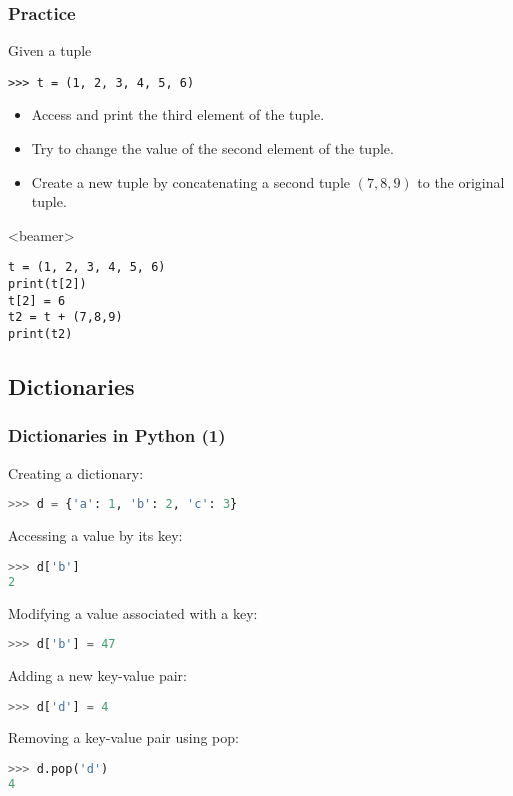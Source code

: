 \begin{frame}[fragile,label=practice_tuples]
  \frametitle{Practice}
  Given a tuple
  \begin{lstlisting}
>>> t = (1, 2, 3, 4, 5, 6)
  \end{lstlisting}
  \begin{itemize}
   \item Access and print the third element of the tuple.
   \item Try to change the value of the second element of the tuple.
   \item Create a new tuple by concatenating a second tuple \((7, 8, 9)\) to the original tuple.
  \end{itemize}\pause
  \begin{onlyenv}<beamer>
    \begin{lstlisting}[]
t = (1, 2, 3, 4, 5, 6)
print(t[2])
t[2] = 6
t2 = t + (7,8,9)
print(t2)
    \end{lstlisting}
  \end{onlyenv}
 \end{frame}

\subsection{Dictionaries}
\begin{frame}[fragile]
  \frametitle{Dictionaries in Python (1)}
  Creating a dictionary:
  \begin{lstlisting}[language=Python,numbers=none]
>>> d = {'a': 1, 'b': 2, 'c': 3}
  \end{lstlisting}
  Accessing a value by its key:
  \begin{lstlisting}[language=Python,numbers=none]
>>> d['b']
2
  \end{lstlisting}
  Modifying a value associated with a key:
  \begin{lstlisting}[language=Python,numbers=none]
>>> d['b'] = 47
  \end{lstlisting}
  Adding a new key-value pair:
  \begin{lstlisting}[language=Python,numbers=none]
>>> d['d'] = 4
  \end{lstlisting}
  Removing a key-value pair using pop:
  \begin{lstlisting}[language=Python,numbers=none]
>>> d.pop('d')
4
  \end{lstlisting}
\end{frame}

